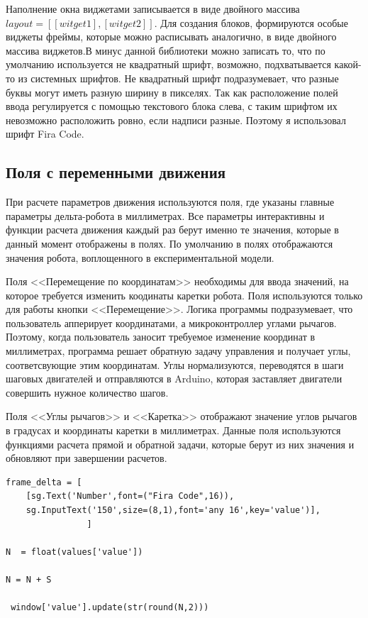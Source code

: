 Наполнение окна виджетами записывается в виде двойного массива $layout = [ [witget1], [witget2]]$. Для создания блоков, формируются особые виджеты фреймы, которые можно расписывать аналогично, в виде двойного массива виджетов.В минус данной библиотеки можно записать то, что по умолчанию используется не квадратный шрифт, возможно, подхватывается какой-то из системных шрифтов. Не квадратный шрифт подразумевает, что разные буквы могут иметь разную ширину в пикселях. Так как расположение полей ввода регулируется с помощью текстового блока слева, с таким шрифтом их невозможно расположить ровно, если надписи разные. Поэтому я использовал шрифт Fira Code.

\subsection{Поля с переменными движения}

При расчете параметров движения используются поля, где указаны главные параметры дельта-робота в миллиметрах. Все параметры интерактивны и функции расчета движения каждый раз берут именно те значения, которые в данный момент отображены в полях. По умолчанию в полях отображаются значения робота, воплощенного в експериментальной модели.


Поля <<Перемещение по координатам>> необходимы для ввода значений, на которое требуется изменить коодинаты каретки робота. Поля используются только для работы кнопки <<Перемещение>>. Логика программы подразумевает, что пользователь апперирует координатами, а микроконтроллер углами рычагов. Поэтому, когда пользователь заносит требуемое изменение координат в миллиметрах, программа решает обратную задачу управления и получает углы, соответсвующие этим координатам. Углы нормализуются, переводятся в шаги шаговых двигателей и отправляются в  Arduino, которая заставляет двигатели совершить нужное количество шагов.

Поля <<Углы рычагов>> и <<Каретка>> отображают значение углов рычагов в градусах и координаты каретки в миллиметрах. Данные поля используются функциями расчета прямой и обратной задачи, которые берут из них значения и обновляют при завершении расчетов.

\begin{lstlisting}[style=python,caption=Получение и обновление значения виджета]
frame_delta = [
    [sg.Text('Number',font=("Fira Code",16)),
    sg.InputText('150',size=(8,1),font='any 16',key='value')],
                ]

N  = float(values['value'])

N = N + S

 window['value'].update(str(round(N,2)))
\end{lstlisting}

